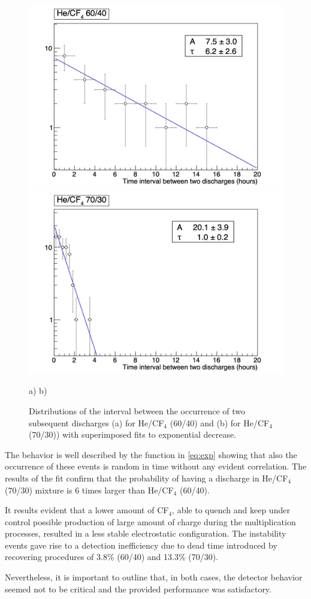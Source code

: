 \documentclass[a4paper,11pt]{article}
\begin{document}
\begin{figure}[ht]
	\begin{center}
	\includegraphics[width=0.45\linewidth]{Figures/hDistDis_6040.png}
	\includegraphics[width=0.45\linewidth]{Figures/hDistDis_7030.png}
	\end{center}	
\vspace{-0.6cm}
\hspace{4cm}\mbox{a)} \hspace{6.5cm} \mbox{b)}
\vspace{-0.3cm}

  	\caption{Distributions of the interval between the occurrence of two subsequent discharges (a) for He/CF$_4$ (60/40) and (b) for He/CF$_4$ (70/30)) with superimposed fits to exponential decrease.}
  	\label{fig:hDistDis}
\end{figure}

The behavior is well described by the function in \ref{eq:exp} showing that also the occurrence of these events is random in time without any evident correlation.
The results of the fit confirm that the probability of having a discharge in He/CF$_4$ (70/30) mixture is 6 times larger than He/CF$_4$ (60/40).

It results evident that a lower amount of CF$_4$, able to quench and keep under control possible production of large amount of charge during the multiplication processes, resulted in a less stable electrostatic configuration. The instability events gave rise to a detection inefficiency due to dead time introduced by recovering procedures of 3.8\% (60/40) and 13.3\% (70/30).

Nevertheless, it is important to outline that, in both cases, the detector behavior seemed not to be critical and the provided performance was satisfactory. 
\end{document}
